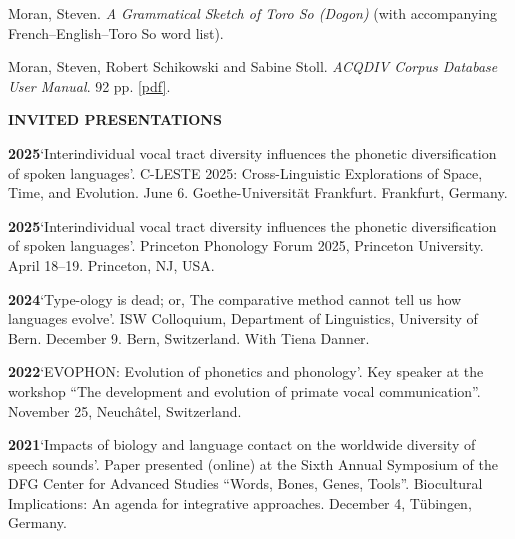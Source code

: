 \documentclass[11pt]{article}
\newcommand{\hangpara}{
 \setlength{\parindent}{0in} %
 \hangindent=0.42in %
}
\begin{document}
\vskip 6pt
\hangpara
Moran, Steven. \textit{A Grammatical Sketch of Toro So (Dogon)} (with accompanying French--English--Toro So word list).

\vskip 6pt
\hangpara
Moran, Steven, Robert Schikowski and Sabine Stoll. {\it ACQDIV Corpus Database User Manual}. 92 pp. \href{https://github.com/acqdiv/corpus_manual/blob/master/corpus_manual.pdf}{[pdf]}.



\vskip 20pt
\begin{flushleft}
{\bf INVITED PRESENTATIONS}
\end{flushleft}

\hangpara
{\bf 2025}\hspace{1ex}`Interindividual vocal tract diversity influences the phonetic diversification of spoken languages'. C-LESTE 2025: Cross-Linguistic Explorations of Space, Time, and Evolution. June 6. Goethe-Universität Frankfurt. Frankfurt, Germany.

\vskip 6pt
\hangpara
{\bf 2025}\hspace{1ex}`Interindividual vocal tract diversity influences the phonetic diversification of spoken languages'. Princeton Phonology Forum 2025, Princeton University. April 18--19. Princeton, NJ, USA.

\vskip 6pt
\hangpara
{\bf 2024}\hspace{1ex}`Type-ology is dead; or, The comparative method cannot tell us how languages evolve'. ISW Colloquium, Department of Linguistics, University of Bern. December 9. Bern, Switzerland. With Tiena Danner.

\vskip 6pt
\hangpara
{\bf 2022}\hspace{1ex}`EVOPHON: Evolution of phonetics and phonology'. Key speaker at the workshop ``The development and evolution of primate vocal communication''. November 25, Neuchâtel, Switzerland.

\vskip 6pt
\hangpara
{\bf 2021}\hspace{1ex}`Impacts of biology and language contact on the worldwide diversity of speech sounds'. Paper presented (online) at the Sixth Annual Symposium of the DFG Center for Advanced Studies ``Words, Bones, Genes, Tools''. Biocultural Implications: An agenda for integrative approaches. December 4, Tübingen, Germany.
\end{document}
